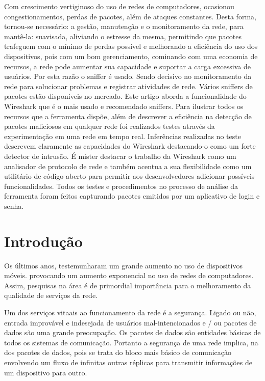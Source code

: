 \documentclass[12pt]{article}
\begin{document}
\begin{resumo} 
  Com crescimento vertiginoso do uso de redes de computadores, ocasionou congestionamentos, perdas de pacotes, além de ataques constantes. Desta forma, tornou-se necessário: a gestão, manutenção e o monitoramento da rede,  para mantê-la: suavisada, aliviando o estresse da mesma, permitindo que pacotes trafeguem com o mínimo de perdas possível e melhorando a eficiência do uso dos dispositivos, pois com um bom gerenciamento, cominando com uma economia de recursos, a rede pode aumentar sua capacidade e suportar a carga excessiva de usuários. Por esta razão o sniffer é usado. Sendo decisivo no monitoramento da rede para solucionar problemas e registrar
atividades de rede. Vários sniffers de pacotes estão disponíveis no mercado.  Este artigo aborda a funcionalidade do Wireshark que é o mais usado e recomendado sniffers. Para ilustrar todos os recursos que a ferramenta dispõe, além de descrever a eficiência na detecção de pacotes maliciosos em qualquer rede foi realizados testes através da experimentação em uma rede em tempo real. Inferências realizadas no teste descrevem claramente as capacidades do Wireshark
destacando-o como um forte detector de intrusão. É mister destacar o
trabalho da Wireshark como um analisador de protocolo de rede e também
acentua a sua flexibilidade como um utilitário de código aberto para permitir
aos desenvolvedores  adicionar possíveis funcionalidades.  Todos os testes e procedimentos no processo de análise da ferramenta foram feitos capturando pacotes emitidos por um aplicativo de login e senha.
\end{resumo}


\section{Introdução}

	Os últimos anos, testemunharam um grande aumento no uso de dispositivos móveis. provocando um aumento exponencial no uso de redes de computadores. Assim, pesquisas na área é de primordial importância para o melhoramento da qualidade de serviços da rede.

Um dos serviços vitaais ao funcionamento da rede é a segurança. Ligado ou não, entrada improvável e indesejada de usuários mal-intencionados e / ou pacotes de dados são uma grande preocupação. Os pacotes de dados são entidades básicas de todos os sistemas de comunicação. Portanto a segurança de uma rede implica, na dos pacotes de dados, pois se trata do bloco mais básico de comunicação envolvendo um fluxo de infinitas outras réplicas para transmitir informações
de um dispositivo para outro.
\end{document}
